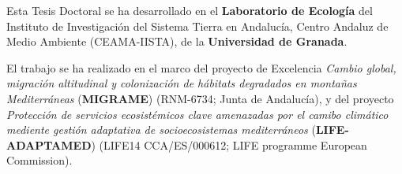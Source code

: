 \clearpage
\thispagestyle{empty}


\justifying


Esta Tesis Doctoral se ha desarrollado en el \textbf{Laboratorio de Ecología} del Instituto de Investigación del Sistema Tierra en Andalucía, Centro Andaluz de Medio Ambiente (CEAMA-IISTA), de la \textbf{Universidad de Granada}. 

El trabajo se ha realizado en el marco del proyecto de Excelencia \textit{Cambio global, migración altitudinal y colonización de hábitats degradados en montañas Mediterráneas} (\textbf{MIGRAME}) (RNM-6734; Junta de Andalucía), y del proyecto \textit{Protección de servicios ecosistémicos clave amenazadas por el camibo climático mediente gestión adaptativa de socioecosistemas mediterráneos} (\textbf{LIFE-ADAPTAMED}) (LIFE14 CCA/ES/000612; LIFE programme European Commission). 


\endinput